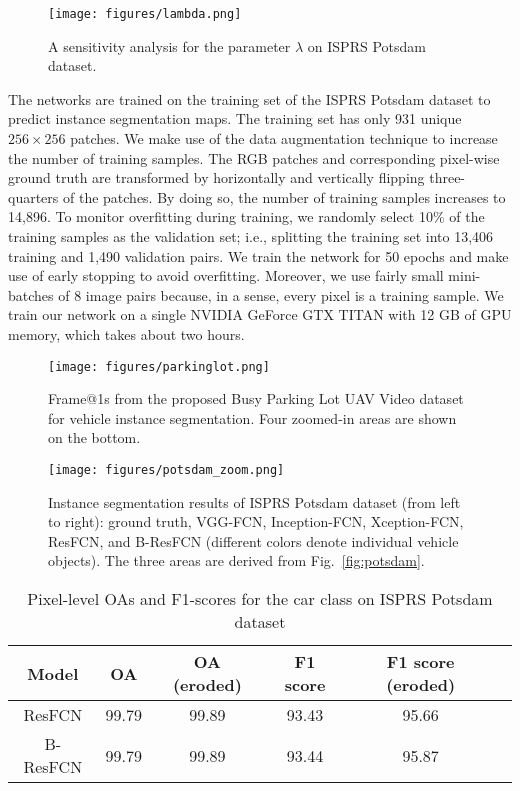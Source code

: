 \documentclass[journal]{IEEEtran}
\newcommand{\RR}[2]{\textcolor[rgb]{0,0,0}
{#2}}
\begin{document}
\begin{figure}[ht]
\centering
\texttt{[image: figures/lambda.png]}
\renewcommand{\figurename}{Fig}
\caption{\label{fig:lambda} \RR{}{A sensitivity analysis for the parameter $\lambda$ on ISPRS Potsdam dataset.}}
\end{figure}

\par
The networks are trained on the training set of the ISPRS Potsdam dataset to predict instance segmentation maps. The training set has only 931 unique $256\times256$ patches. We make use of the data augmentation technique to increase the number of training samples. The RGB patches and corresponding pixel-wise ground truth are transformed by horizontally and vertically flipping three-quarters of the patches. By doing so, the number of training samples increases to 14,896. To monitor overfitting during training, we randomly select 10\% of the training samples as the validation set; i.e., splitting the training set into 13,406 training and 1,490 validation pairs. We train the network for 50 epochs and make use of early stopping to avoid overfitting. Moreover, we use fairly small mini-batches of 8 image pairs because, in a sense, every pixel is a training sample. We train our network on a single NVIDIA GeForce GTX TITAN with 12 GB of GPU memory, which takes about two hours.

\begin{figure}[t]
\centering
\texttt{[image: figures/parkinglot.png]}
\renewcommand{\figurename}{Fig}
\caption{\label{fig:parkinglot} Frame@1s from the proposed Busy Parking Lot UAV Video dataset for vehicle instance segmentation. Four zoomed-in areas are shown on the bottom.}
\end{figure}

\begin{figure*}[t]
\centering
\texttt{[image: figures/potsdam\_zoom.png]}
\renewcommand{\figurename}{Fig}
\caption{\label{fig:potsdam_zoom} Instance segmentation results of ISPRS Potsdam dataset (from left to right): ground truth, VGG-FCN, Inception-FCN, Xception-FCN, ResFCN, and B-ResFCN (different colors denote individual vehicle objects). The three areas are derived from Fig.~\ref{fig:potsdam}.}
\end{figure*}


\begin{table}[t]
\caption{\label{tab:oa} \RR{}{Pixel-level OAs and F1-scores for the car class} on ISPRS Potsdam dataset}
\centering
\begin{tabular}{cccccc}
\toprule
\textbf{Model} & \textbf{OA} & \textbf{OA (eroded)} & \textbf{F1 score} & \textbf{F1 score (eroded)} \\
\hline
ResFCN & 99.79 & 99.89 & 93.43 & 95.66 \\
B-ResFCN & 99.79 & 99.89 & 93.44 & 95.87 \\
\bottomrule
\end{tabular}
\end{table}
\end{document}
